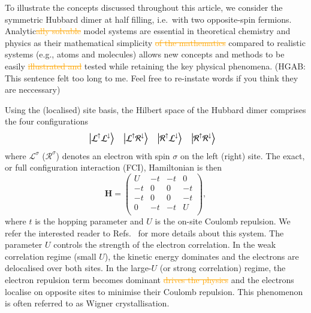 \documentclass[aps,prb,reprint,noshowkeys,linenumbers,superscriptaddress]{revtex4-1}
\newcommand{\hugh}[1]{\textcolor{hughgreen}{#1}}
\newcommand{\trashHB}[1]{\textcolor{orange}{\sout{#1}}}
\newcommand{\latin}[1]{#1}
\newcommand{\ie}{\latin{i.e.}}
\newcommand{\bH}{\mathbf{H}}
\newcommand{\Lup}{\mathcal{L}^{\uparrow}}
\newcommand{\Ldown}{\mathcal{L}^{\downarrow}}
\newcommand{\Lsi}{\mathcal{L}^{\sigma}}
\newcommand{\Rup}{\mathcal{R}^{\uparrow}}
\newcommand{\Rdown}{\mathcal{R}^{\downarrow}}
\newcommand{\Rsi}{\mathcal{R}^{\sigma}}
\begin{document}
To illustrate the concepts discussed throughout this article, we consider the symmetric Hubbard dimer at half filling, \ie\ with two opposite-spin fermions.
Analytic\trashHB{ally solvable} model systems are essential in theoretical chemistry and physics as their \hugh{mathematical} simplicity \trashHB{of the
mathematics} compared to realistic systems (e.g., atoms and molecules) allows new concepts and methods to be 
easily \trashHB{illustrated and} tested while retaining the key physical phenomena.
\hugh{(HGAB: This sentence felt too long to me. Feel free to re-instate words if you think they are neccessary)}

Using the (localised) site basis, the Hilbert space of the Hubbard dimer comprises the four configurations
\begin{align}
& \ket{\Lup \Ldown} &  & \ket{\Lup\Rdown} &  & \ket{\Rup\Ldown} &  & \ket{\Rup\Rdown}
\end{align}
where $\Lsi$ ($\Rsi$) denotes an electron with spin $\sigma$ on the left (right) site.
The exact, or full configuration interaction (FCI), Hamiltonian is then 
\begin{equation}
\label{eq:H_FCI}
	\bH = 
	\begin{pmatrix}
		U &	- t & -  t & 0	\\
	   -  t &  0 &  0 & -  t \\
       -  t &  0 &  0 & -  t \\
        0 & -  t & -  t & U \\
	\end{pmatrix},
\end{equation}
where $t$ is the hopping parameter and $U$ is the on-site Coulomb repulsion.
We refer the interested reader to Refs.~ for more details about this system.
The parameter $U$ controls the strength of the electron correlation.
In the weak correlation regime (small $U$), the kinetic energy dominates and the electrons are delocalised over both sites.
In the large-$U$ (or strong correlation) regime, the electron repulsion term \hugh{becomes dominant} \trashHB{drives the physics}
and the electrons localise on opposite sites to minimise their Coulomb repulsion. 
This phenomenon is often referred to as Wigner crystallisation. \cite{Wigner_1934}
\end{document}
